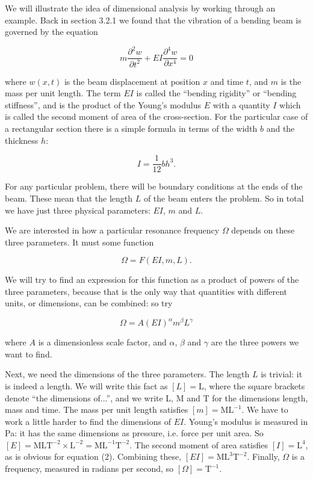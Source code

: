   We will illustrate the idea of dimensional analysis by working through an 
  example. Back in section 3.2.1 we found that the vibration of a bending beam 
  is governed by the equation 

  \begin{equation*}m \dfrac{\partial^2 w}{\partial t^2}+EI \dfrac{\partial^4 
  w}{\partial x^4}=0 \tag{1}\end{equation*} 

  \noindent{}where $w(x,t)$ is the beam displacement at position $x$ and time 
  $t$, and $m$ is the mass per unit length. The term $EI$ is called the 
  ``bending rigidity'' or ``bending stiffness'', and is the product of the 
  Young's modulus $E$ with a quantity $I$ which is called the second moment of 
  area of the cross-section. For the particular case of a rectangular section 
  there is a simple formula in terms of the width $b$ and the thickness $h$: 

  \begin{equation*}I=\dfrac{1}{12} bh^3. \tag{2}\end{equation*} 

  For any particular problem, there will be boundary conditions at the ends of 
  the beam. These mean that the length $L$ of the beam enters the problem. So 
  in total we have just three physical parameters: $EI$, $m$ and $L$. 

  We are interested in how a particular resonance frequency $\Omega$ depends on 
  these three parameters. It must some function 

  \begin{equation*}\Omega = F(EI,m,L) . \tag{3}\end{equation*} 

  We will try to find an expression for this function as a product of powers of 
  the three parameters, because that is the only way that quantities with 
  different units, or dimensions, can be combined: so try 

  \begin{equation*}\Omega=A (EI)^\alpha m^\beta L^\gamma \tag{4}\end{equation*} 

  \noindent{}where $A$ is a dimensionless scale factor, and $\alpha$, $\beta$ 
  and $\gamma$ are the three powers we want to find. 

  Next, we need the dimensions of the three parameters. The length $L$ is 
  trivial: it is indeed a length. We will write this fact as $[L] = 
  \mathrm{L}$, where the square brackets denote ``the dimensions of...'', and 
  we write L, M and T for the dimensions length, mass and time. The mass per 
  unit length satisfies $[m] = \mathrm{M} \mathrm{L}^{-1}$. We have to work a 
  little harder to find the dimensions of $EI$. Young's modulus is measured in 
  Pa: it has the same dimensions as pressure, i.e. force per unit area. So $[E] 
  = \mathrm{M} \mathrm{L} \mathrm{T}^{-2} \times \mathrm{L}^{-2} = \mathrm{M} 
  \mathrm{L}^{-1} \mathrm{T}^{-2}$. The second moment of area satisfies $[I] = 
  \mathrm{L}^4$, as is obvious for equation (2). Combining these, $[EI] = 
  \mathrm{M} \mathrm{L}^3 \mathrm{T}^{-2}$. Finally, $\Omega$ is a frequency, 
  measured in radians per second, so $[\Omega] = \mathrm{T}^{-1}$. 

